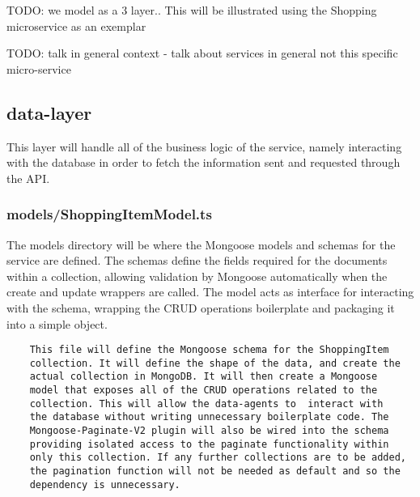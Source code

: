 TODO: we model as a 3 layer.. This will be illustrated using the Shopping microservice as an exemplar

TODO: talk in general context - talk about services in general not this specific micro-service
\subsection{data-layer}
This layer will handle all of the business logic of the service, namely interacting with the database in order to fetch the information sent and requested through the API.
\subsubsection{models/ShoppingItemModel.ts}
The models directory will be where the Mongoose models and schemas for the service are defined. The schemas define the fields required for the documents within a collection, allowing validation by Mongoose automatically when the create and update wrappers are called. The model acts as interface for interacting with the schema, wrapping the CRUD operations boilerplate and packaging it into a simple object.  
\begin{verbatim}
    This file will define the Mongoose schema for the ShoppingItem 
    collection. It will define the shape of the data, and create the
    actual collection in MongoDB. It will then create a Mongoose 
    model that exposes all of the CRUD operations related to the 
    collection. This will allow the data-agents to  interact with
    the database without writing unnecessary boilerplate code. The
    Mongoose-Paginate-V2 plugin will also be wired into the schema 
    providing isolated access to the paginate functionality within
    only this collection. If any further collections are to be added,
    the pagination function will not be needed as default and so the
    dependency is unnecessary.
\end{verbatim}
